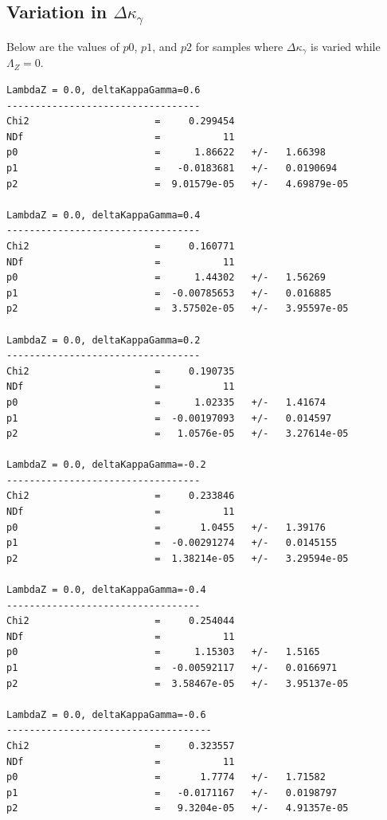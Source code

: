 \subsection{Variation in \texorpdfstring{$\Delta{\kappa_\gamma}$}{deltaKappaGamma}}
Below are the values of $p0$, $p1$, and $p2$ 
for samples where $\Delta{\kappa_\gamma}$ is varied 
while $\Lambda_Z = 0$.


\begin{verbatim}
LambdaZ = 0.0, deltaKappaGamma=0.6
----------------------------------
Chi2                      =     0.299454
NDf                       =           11
p0                        =      1.86622   +/-   1.66398     
p1                        =   -0.0183681   +/-   0.0190694   
p2                        =  9.01579e-05   +/-   4.69879e-05 

LambdaZ = 0.0, deltaKappaGamma=0.4
----------------------------------
Chi2                      =     0.160771
NDf                       =           11
p0                        =      1.44302   +/-   1.56269     
p1                        =  -0.00785653   +/-   0.016885    
p2                        =  3.57502e-05   +/-   3.95597e-05 

LambdaZ = 0.0, deltaKappaGamma=0.2
----------------------------------
Chi2                      =     0.190735
NDf                       =           11
p0                        =      1.02335   +/-   1.41674     
p1                        =  -0.00197093   +/-   0.014597    
p2                        =   1.0576e-05   +/-   3.27614e-05 

LambdaZ = 0.0, deltaKappaGamma=-0.2
----------------------------------
Chi2                      =     0.233846
NDf                       =           11
p0                        =       1.0455   +/-   1.39176     
p1                        =  -0.00291274   +/-   0.0145155   
p2                        =  1.38214e-05   +/-   3.29594e-05 

LambdaZ = 0.0, deltaKappaGamma=-0.4
----------------------------------
Chi2                      =     0.254044
NDf                       =           11
p0                        =      1.15303   +/-   1.5165      
p1                        =  -0.00592117   +/-   0.0166971   
p2                        =  3.58467e-05   +/-   3.95137e-05 

LambdaZ = 0.0, deltaKappaGamma=-0.6
------------------------------------
Chi2                      =     0.323557
NDf                       =           11
p0                        =       1.7774   +/-   1.71582     
p1                        =   -0.0171167   +/-   0.0198797   
p2                        =   9.3204e-05   +/-   4.91357e-05 
\end{verbatim}


